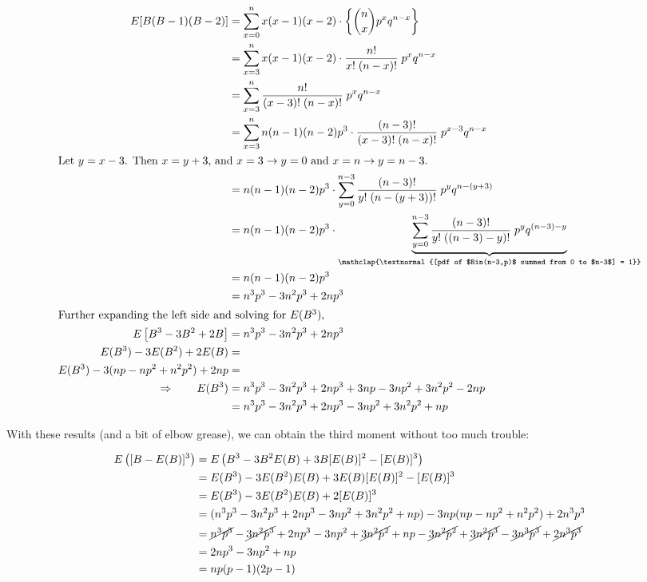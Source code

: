 \begin{align*}
  E[B(B-1)(B-2)] &= \sum_{x=0}^n x (x-1) (x-2) \cdot \left\{ \binom{n}{x} p^x q^{n-x} \right\} \\
  &= \sum_{x=3}^n x(x-1)(x-2) \cdot \frac{n!}{x!\;(n-x)!} \; p^x q^{n-x} \\
  &= \sum_{x=3}^n \frac{n!}{(x-3)!\;(n-x)!} \; p^x q^{n-x} \\
  &= \sum_{x=3}^n n(n-1)(n-2) p^3 \cdot \frac{(n-3)!}{(x-3)!\;(n-x)!} \; p^{x-3}q^{n-x} \\
  \intertext{Let $y=x-3$. Then $x=y+3$, and $x=3 \rightarrow y=0$ and $x=n \rightarrow y=n-3$.}
  &= n(n-1)(n-2)p^3 \cdot \sum_{y=0}^{n-3} \frac{(n-3)!}{y!\;(n-(y+3))!} \; p^y q^{n-(y+3)} \\
  &= n(n-1)(n-2)p^3 \cdot \underbrace {\sum_{y=0}^{n-3} \frac{(n-3)!}{y!\;((n-3)-y)!} \; p^y q^{(n-3)-y}}_{\mathclap{\textnormal{[pdf of $Bin(n-3,p)$ summed from 0 to $n-3$] = 1}}} \\
  &= n(n-1)(n-2)p^3 \\
  &= n^3p^3 - 3n^2p^3 + 2np^3 \\
  \intertext{Further expanding the left side and solving for $E(B^3)$,}
  E \left[ B^3 - 3B^2 + 2B \right] &= n^3p^3 - 3n^2p^3 + 2np^3 \\
  E(B^3) - 3E(B^2) + 2E(B) &= \\
  E(B^3) - 3(np - np^2 + n^2p^2) + 2np &= \\
  \Rightarrow \qquad E(B^3) &= n^3p^3 - 3n^2p^3 + 2np^3 + 3np - 3np^2 + 3n^2p^2 - 2np \\
  &= n^3p^3 - 3n^2p^3 + 2np^3 - 3np^2 + 3n^2p^2 + np
\end{align*}

With these results (and a bit of elbow grease), we can obtain the third moment
without too much trouble:

\begin{align*}
  E \left( [B - E(B)]^3 \right) &= E \left( B^3 - 3B^2 E(B) + 3B [E(B)]^2 - [E(B)]^3 \right) \\
  &= E(B^3) - 3 E(B^2) E(B) + 3 E(B) [E(B)]^2 - [E(B)]^3 \\
  &= E(B^3) - 3 E(B^2) E(B) + 2 [E(B)]^3 \\
  &= (n^3p^3 - 3n^2p^3 + 2np^3 - 3np^2 + 3n^2p^2 + np) - 3np(np - np^2 + n^2p^2) + 2n^3p^3 \\
  &= \cancel{n^3p^3} - \cancel{3n^2p^3} + 2np^3 - 3np^2 + \cancel{3n^2p^2} + np - \cancel{3n^2p^2} + \cancel{3n^2p^3} - \cancel{3n^3p^3} + \cancel{2n^3p^3} \\
  &= 2np^3 - 3np^2 + np \\
  &= np(p-1)(2p-1)
\end{align*}

